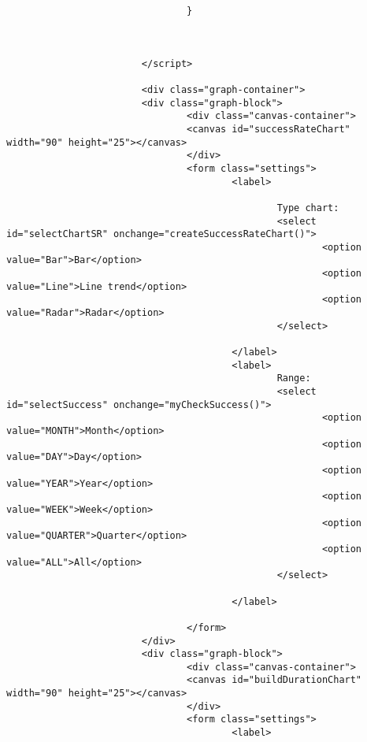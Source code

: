 \begin{lstlisting}
                                }



                        </script>

                        <div class="graph-container">
                        <div class="graph-block">
                                <div class="canvas-container">
                                <canvas id="successRateChart" width="90" height="25"></canvas>
                                </div>
                                <form class="settings">
                                        <label>

                                                Type chart:
                                                <select id="selectChartSR" onchange="createSuccessRateChart()">
                                                        <option value="Bar">Bar</option>
                                                        <option value="Line">Line trend</option>
                                                        <option value="Radar">Radar</option>
                                                </select>

                                        </label>
                                        <label>
                                                Range:
                                                <select id="selectSuccess" onchange="myCheckSuccess()">
                                                        <option value="MONTH">Month</option>
                                                        <option value="DAY">Day</option>
                                                        <option value="YEAR">Year</option>
                                                        <option value="WEEK">Week</option>
                                                        <option value="QUARTER">Quarter</option>
                                                        <option value="ALL">All</option>
                                                </select>

                                        </label>

                                </form>
                        </div>
                        <div class="graph-block">
                                <div class="canvas-container">
                                <canvas id="buildDurationChart" width="90" height="25"></canvas>
                                </div>
                                <form class="settings">
                                        <label>


\end{lstlisting}
